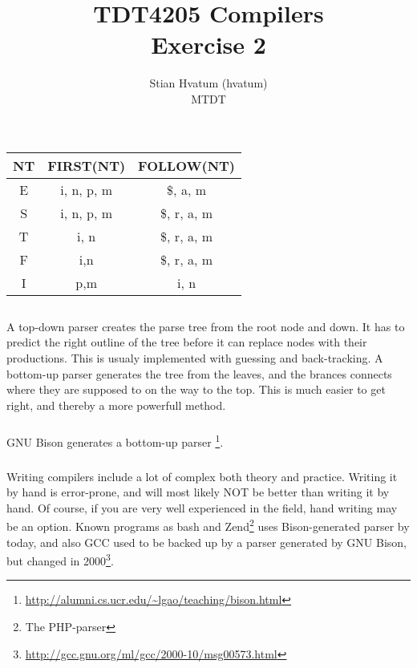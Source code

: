 \documentclass{article}
\title{TDT4205 Compilers\\
\Huge Exercise 2}
\author{Stian Hvatum (hvatum)\\MTDT}
\begin{document}
\maketitle

\section{}
\subsection{}
\begin{tabular}{|c|c|c|}
\hline
NT & FIRST(NT) & FOLLOW(NT) \\
\hline
\hline
E & {i, n, p, m} & {\$, a, m} \\
\hline
S & {i, n, p, m} & {\$, r, a, m}\\
\hline
T & {i, n} & {\$, r, a, m}\\
\hline
F & {i,n} & {\$, r, a, m} \\
\hline
I & {p,m} & {i, n} \\
\hline
\end{tabular}

\subsection{}
\subsubsection{}
A top-down parser creates the parse tree from the root node and down. It has to
predict the right outline of the tree before it can replace nodes with their
productions. This is usualy implemented with guessing and back-tracking. A
bottom-up parser generates the tree from the leaves, and the brances connects where they are supposed to on the way to the top. This is much
easier to get right, and thereby a more powerfull method.

\subsubsection{}
GNU Bison generates a bottom-up parser
\footnote{\url{http://alumni.cs.ucr.edu/~lgao/teaching/bison.html}}.

\subsubsection{}
Writing compilers include a lot of complex both theory and practice. Writing it
by hand is error-prone, and will most likely NOT be better than writing it by
hand. Of course, if you are very well experienced in the field, hand writing may
be an option. Known programs as {\ttfamily bash} and
{\ttfamily Zend\footnote{The PHP-parser}} uses Bison-generated parser by today,
and also GCC used to be backed up by a parser generated by GNU Bison, but
changed in 2000\footnote{\url{http://gcc.gnu.org/ml/gcc/2000-10/msg00573.html}}.
\end{document}
